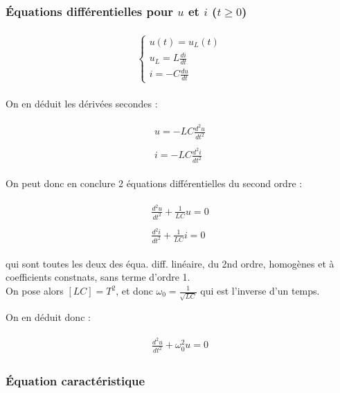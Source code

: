 \documentclass{article}
\begin{document}
\subsubsection{Équations différentielles pour $u$ et $i$ ($t\ge0$)}

\begin{align*}\begin{split}
\begin{cases}
u(t)=u_L(t)\\
u_L=L\frac{di}{dt}\\
i=-C\frac{du}{dt}
\end{cases}
\end{split}\end{align*}

On en déduit les dérivées secondes :

\begin{align*}\begin{split}
u=-LC\frac{d^2u}{dt^2}\\\\
i=-LC\frac{d^2i}{dt^2}
\end{split}\end{align*}

On peut donc en conclure 2 équations différentielles du second ordre :

\begin{align*}\begin{split}
    \boxed{\frac{d^2u}{dt^2}+\frac{1}{LC}u=0}\\\\
    \boxed{\frac{d^2i}{dt^2}+\frac{1}{LC}i=0}
\end{split}\end{align*}

qui sont toutes les deux des équa. diff. linéaire, du 2nd ordre, homogènes et à coefficients constnats, sans terme d'ordre 1.
\\
On pose alors $[LC]=T^2$, et donc $\omega_0=\frac{1}{\sqrt{LC}}$ qui est l'inverse d'un temps.

On en déduit donc :

\begin{align*}\begin{split}
    \frac{d^2u}{dt^2}+\omega_0^2u=0
\end{split}\end{align*}

\subsubsection{Équation caractéristique}
\end{document}
